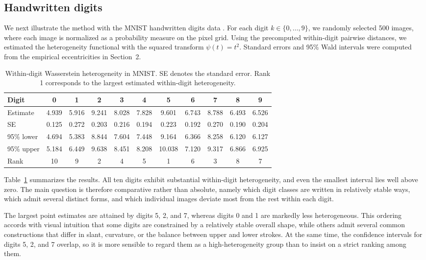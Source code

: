 \documentclass[10pt]{article}
\begin{document}
\subsection{Handwritten digits}

We next illustrate the method with the MNIST handwritten digits data \citep{lecun_1998_MNISTDatabaseHandwritten}. For each digit $k\in\{0,\ldots,9\}$, we randomly selected 500 images, where each image is normalized as a probability measure on the pixel grid. Using the precomputed within-digit pairwise distances, we estimated the heterogeneity functional with the squared transform $\psi(t)=t^2$. Standard errors and 95\% Wald intervals were computed from the empirical eccentricities in Section~2.


\begin{table}[t]
\centering
\begin{tabular}{lcccccccccc}
\hline
Digit & 0 & 1 & 2 & 3 & 4 & 5 & 6 & 7 & 8 & 9 \\
\hline
Estimate    & 4.939 & 5.916 & 9.241 & 8.028 & 7.828 & 9.601 & 6.743 & 8.788 & 6.493 & 6.526 \\
SE          & 0.125 & 0.272 & 0.203 & 0.216 & 0.194 & 0.223 & 0.192 & 0.270 & 0.190 & 0.204 \\
95\% lower  & 4.694 & 5.383 & 8.844 & 7.604 & 7.448 & 9.164 & 6.366 & 8.258 & 6.120 & 6.127 \\
95\% upper  & 5.184 & 6.449 & 9.638 & 8.451 & 8.208 & 10.038 & 7.120 & 9.317 & 6.866 & 6.925 \\
Rank        & 10 & 9 & 2 & 4 & 5 & 1 & 6 & 3 & 8 & 7 \\
\hline
\end{tabular}
\caption{Within-digit Wasserstein heterogeneity in MNIST. SE denotes the standard error. Rank 1 corresponds to the largest estimated within-digit heterogeneity.}
\label{tab:mnist-summary}
\end{table}

Table~\ref{tab:mnist-summary} summarizes the results. All ten digits exhibit substantial within-digit heterogeneity, and even the smallest interval lies well above zero. The main question is therefore comparative rather than absolute, namely which digit classes are written in relatively stable ways, which admit several distinct forms, and which individual images deviate most from the rest within each digit.



The largest point estimates are attained by digits 5, 2, and 7, whereas digits 0 and 1 are markedly less heterogeneous. This ordering accords with visual intuition that some digits are constrained by a relatively stable overall shape, while others admit several common constructions that differ in slant, curvature, or the balance between upper and lower strokes. At the same time, the confidence intervals for digits 5, 2, and 7 overlap, so it is more sensible to regard them as a high-heterogeneity group than to insist on a strict ranking among them.
\end{document}
